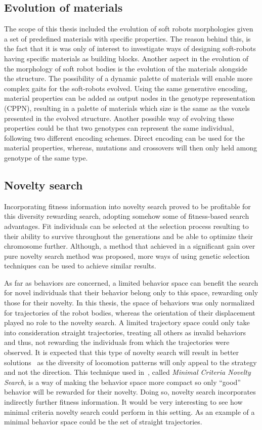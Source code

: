 \subsection*{Evolution of materials}
The scope of this thesis included the evolution of soft robots morphologies given a set of predefined materials with specific properties. The reason behind this, is the fact that it is was only of interest to investigate ways of designing soft-robots having specific materials as building blocks. Another aspect in the evolution of the morphology of soft robot bodies is the evolution of the materials alongside the structure. The possibility of a dynamic palette of materials will enable more complex gaits for the soft-robots evolved. Using the same generative encoding, material properties can be added as output nodes in the genotype representation (CPPN), resulting in a palette of materials which size is the same as the voxels presented in the evolved structure. Another possible way of evolving these properties could be that two genotypes can represent the same individual, following two different encoding schemes. Direct encoding can be used for the material properties, whereas, mutations and crossovers will then only held among genotype of the same type.

\subsection*{Novelty search}
Incorporating fitness information into novelty search proved to be profitable for this diversity rewarding search, adopting somehow some of fitness-based search advantages. Fit individuals can be selected at the selection process resulting to their ability to survive throughout the generations and be able to optimize their chromosome further. Although, a method  that achieved in a significant gain over pure novelty search method was proposed, more ways of using genetic selection techniques can be used to achieve similar results.

As far as behaviors are concerned, a limited behavior space can benefit the search for novel individuals that their behavior belong only to this space, rewarding only those for their novelty. In this thesis, the space of behaviors was only normalized for trajectories of the robot bodies, whereas the orientation of their displacement played no role to the novelty search. A limited trajectory space could only take into consideration straight trajectories, treating all others as invalid behaviors and thus, not rewarding the individuals from which the trajectories were observed. It is expected that this type of novelty search will result in better solutions~\citep{lehman2011abandoning} as the diversity of locomotion patterns will only appeal to the strategy and not the direction. This technique used in~\citep{lehman2011abandoning}, called \emph{Minimal Criteria Novelty Search}, is a way of making the behavior space more compact so only ``good'' behavior will be rewarded for their novelty. Doing so, novelty search incorporates indirectly further fitness information. It would be very interesting to see how minimal criteria novelty search could perform in this setting. As an example of a minimal behavior space could be the set of straight trajectories.

